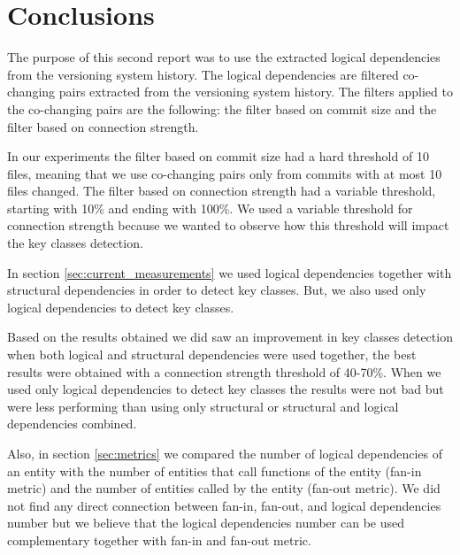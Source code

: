 \documentclass[12pt]{mitthesis}
\begin{document}
\chapter{Conclusions}

The purpose of this second report was to use the extracted logical dependencies from the versioning system history.
The logical dependencies are filtered co-changing pairs extracted from the versioning system history. The filters applied to the co-changing pairs are the following: the filter based on commit size and the filter based on connection strength.

In our experiments the filter based on commit size had a hard threshold of 10 files, meaning that we use co-changing pairs only from commits with at most 10 files changed. The filter based on connection strength had a variable threshold, starting with 10\% and ending with 100\%. We used a variable threshold for connection strength because we wanted to observe how this threshold will impact the key classes detection.

In section \ref{sec:current_measurements} we used logical dependencies together with structural dependencies in order to detect key classes. But, we also used only logical dependencies to detect key classes.

Based on the results obtained we did saw an improvement in key classes detection when both logical and structural dependencies were used together, the best results were obtained with a connection strength threshold of 40-70\%. When we used only logical dependencies to detect key classes the results were not bad but were less performing than using only structural or structural and logical dependencies combined. 

Also, in section \ref{sec:metrics} we compared the number of logical dependencies of an entity with the number of entities that call functions of the entity (fan-in metric) and the number of entities called by the entity (fan-out metric). We did not find any direct connection between fan-in, fan-out, and logical dependencies number but we believe that the logical dependencies number can be used complementary together with fan-in and fan-out metric. 




\end{document}
